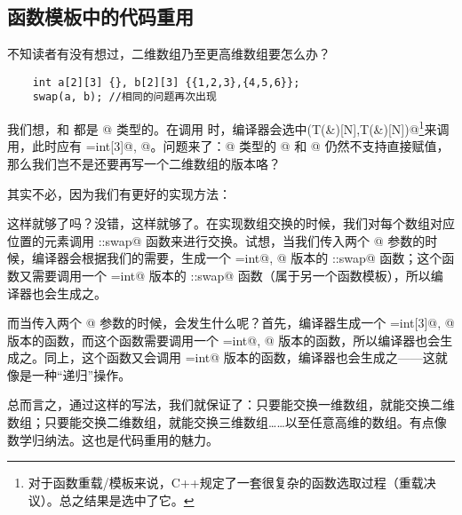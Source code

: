 \subsection*{函数模板中的代码重用}
不知读者有没有想过，二维数组乃至更高维数组要怎么办？
\begin{lstlisting}
    int a[2][3] {}, b[2][3] {{1,2,3},{4,5,6}};
    swap(a, b); //相同的问题再次出现
\end{lstlisting}\par
我们想，\lstinline@a@ 和 \lstinline@b@ 都是 \lstinline@int[2][3]@ 类型的。在调用 \lstinline@swap@ 时，编译器会选中\newline\lstinline@swap(T(&)[N],T(&)[N])@\footnote{对于函数重载/模板来说，C++规定了一套很复杂的函数选取过程（重载决议）。总之结果是选中了它。}来调用，此时应有 \lstinline@T=int[3]@, @。问题来了：\lstinline@int[3]@ 类型的 \lstinline@a[i]@ 和 \lstinline@b[i]@ 仍然不支持直接赋值，那么我们岂不是还要再写一个二维数组的版本咯？\par
其实不必，因为我们有更好的实现方法：

这样就够了吗？没错，这样就够了。在实现数组交换的时候，我们对每个数组对应位置的元素调用 \lstinline@user::swap@ 函数来进行交换。试想，当我们传入两个 \lstinline@int[3]@ 参数的时候，编译器会根据我们的需要，生成一个 \lstinline@T=int@, @ 版本的 \lstinline@user::swap@ 函数；这个函数又需要调用一个 \lstinline@T=int@ 版本的 \lstinline@user::swap@ 函数（属于另一个函数模板），所以编译器也会生成之。\par
而当传入两个 \lstinline@int[2][3]@ 参数的时候，会发生什么呢？首先，编译器生成一个 \lstinline@T=int[3]@, @ 版本的函数，而这个函数需要调用一个 \lstinline@T=int@, @ 版本的函数，所以编译器也会生成之。同上，这个函数又会调用 \lstinline@T=int@ 版本的函数，编译器也会生成之——这就像是一种``递归''操作。\par
总而言之，通过这样的写法，我们就保证了：只要能交换一维数组，就能交换二维数组；只要能交换二维数组，就能交换三维数组……以至任意高维的数组。有点像数学归纳法。这也是代码重用的魅力。\par
